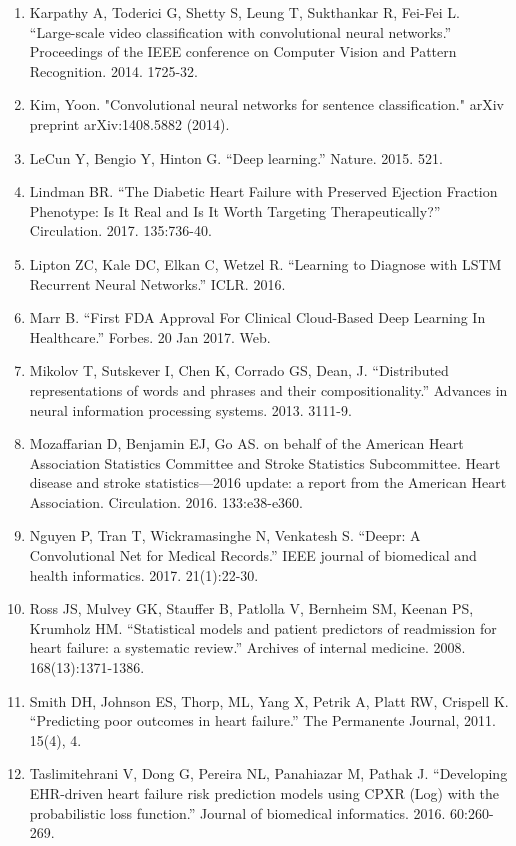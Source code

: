 \documentclass[11pt]{article}
\begin{document}
\begin{enumerate}
		\item Karpathy A, Toderici G, Shetty S, Leung T, Sukthankar R, Fei-Fei L. “Large-scale video classification with convolutional neural networks.” Proceedings of the IEEE conference on Computer Vision and Pattern Recognition. 2014. 1725-32.
		
		\item Kim, Yoon. "Convolutional neural networks for sentence classification." arXiv preprint arXiv:1408.5882 (2014).
		
		\item LeCun Y, Bengio Y, Hinton G. “Deep learning.” Nature. 2015. 521.
		
		\item Lindman BR. “The Diabetic Heart Failure with Preserved Ejection Fraction Phenotype: Is It Real and Is It Worth Targeting Therapeutically?” Circulation. 2017. 135:736-40.
		
		\item Lipton ZC, Kale DC, Elkan C, Wetzel R. “Learning to Diagnose with LSTM Recurrent Neural Networks.” ICLR. 2016.
		
		\item Marr B. “First FDA Approval For Clinical Cloud-Based Deep Learning In Healthcare.” Forbes. 20 Jan 2017. Web.
		
		\item Mikolov T, Sutskever I, Chen K, Corrado GS, Dean, J. “Distributed representations of words and phrases and their compositionality.” Advances in neural information processing systems. 2013. 3111-9.
		
		\item Mozaffarian D, Benjamin EJ, Go AS. on behalf of the American Heart Association Statistics Committee and Stroke Statistics Subcommittee. Heart disease and stroke statistics—2016 update: a report from the American Heart Association. Circulation. 2016. 133:e38-e360.
		
		\item Nguyen P, Tran T, Wickramasinghe N, Venkatesh S. “Deepr: A Convolutional Net for Medical Records.” IEEE journal of biomedical and health informatics. 2017. 21(1):22-30.
		
		\item Ross JS, Mulvey GK, Stauffer B, Patlolla V, Bernheim SM, Keenan PS, Krumholz HM. “Statistical models and patient predictors of readmission for heart failure: a systematic review.” Archives of internal medicine. 2008. 168(13):1371-1386.
		
		\item Smith DH, Johnson ES, Thorp, ML, Yang X, Petrik A, Platt RW, Crispell K. “Predicting poor outcomes in heart failure.” The Permanente Journal, 2011. 15(4), 4.
		
		\item Taslimitehrani V, Dong G, Pereira NL, Panahiazar M, Pathak J. “Developing EHR-driven heart failure risk prediction models using CPXR (Log) with the probabilistic loss function.” Journal of biomedical informatics. 2016. 60:260-269.
	\end{enumerate}
	
\end{document}
